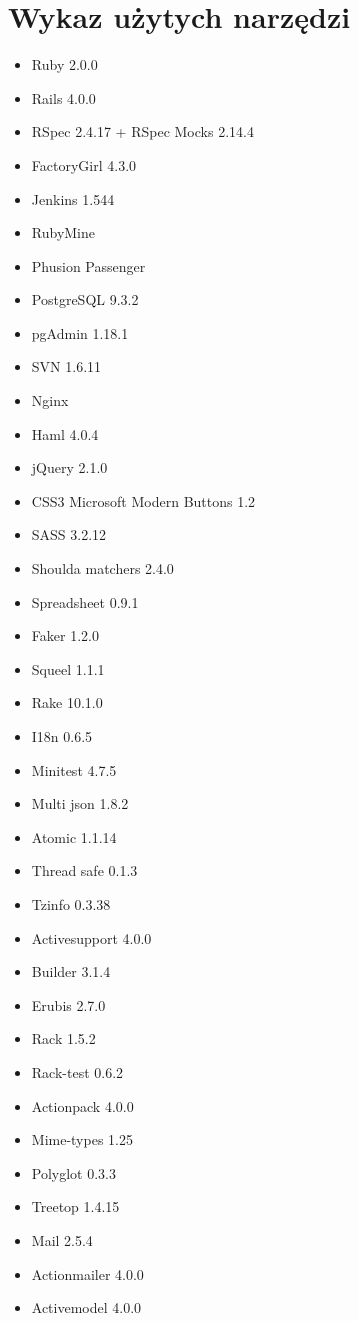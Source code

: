 \section{Wykaz użytych narzędzi}
\label{Chapter104}
\noindent
\begin{itemize} \itemsep0em
\item Ruby 2.0.0
\item Rails 4.0.0
\item RSpec 2.4.17 + RSpec Mocks 2.14.4
\item FactoryGirl 4.3.0
\item Jenkins 1.544
\item RubyMine 
\item Phusion Passenger
\item PostgreSQL 9.3.2
\item pgAdmin 1.18.1
\item SVN 1.6.11
\item Nginx
\item Haml 4.0.4
\item jQuery 2.1.0
\item CSS3 Microsoft Modern Buttons 1.2
\item SASS 3.2.12
\item Shoulda matchers 2.4.0
\item Spreadsheet 0.9.1
\item Faker 1.2.0
\item Squeel 1.1.1
\item Rake 10.1.0
\item I18n 0.6.5
\item Minitest 4.7.5
\item Multi json 1.8.2
\item Atomic 1.1.14
\item Thread safe 0.1.3
\item Tzinfo 0.3.38
\item Activesupport 4.0.0
\item Builder 3.1.4
\item Erubis 2.7.0
\item Rack 1.5.2
\item Rack-test 0.6.2
\item Actionpack 4.0.0
\item Mime-types 1.25
\item Polyglot 0.3.3
\item Treetop 1.4.15
\item Mail 2.5.4
\item Actionmailer 4.0.0
\item Activemodel 4.0.0

\end{itemize}
